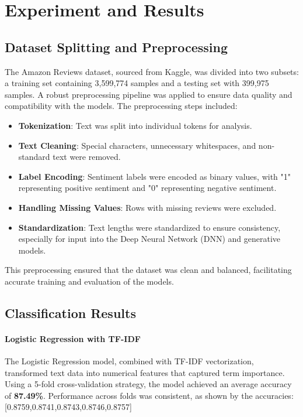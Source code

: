 \documentclass{article}
\begin{document}
\section{Experiment and Results}

\subsection{Dataset Splitting and Preprocessing}
The Amazon Reviews dataset, sourced from Kaggle, was divided into two subsets: a training set containing 3,599,774 samples and a testing set with 399,975 samples. A robust preprocessing pipeline was applied to ensure data quality and compatibility with the models. The preprocessing steps included:
\begin{itemize}
    \item \textbf{Tokenization}: Text was split into individual tokens for analysis.
    \item \textbf{Text Cleaning}: Special characters, unnecessary whitespaces, and non-standard text were removed.
    \item \textbf{Label Encoding}: Sentiment labels were encoded as binary values, with "1" representing positive sentiment and "0" representing negative sentiment.
    \item \textbf{Handling Missing Values}: Rows with missing reviews were excluded.
    \item \textbf{Standardization}: Text lengths were standardized to ensure consistency, especially for input into the Deep Neural Network (DNN) and generative models.
\end{itemize}
This preprocessing ensured that the dataset was clean and balanced, facilitating accurate training and evaluation of the models.

\subsection{Classification Results}

\paragraph{Logistic Regression with TF-IDF}
The Logistic Regression model, combined with TF-IDF vectorization, transformed text data into numerical features that captured term importance. Using a 5-fold cross-validation strategy, the model achieved an average accuracy of \textbf{87.49\%}. Performance across folds was consistent, as shown by the accuracies:
[0.8759,0.8741,0.8743,0.8746,0.8757]
\end{document}
